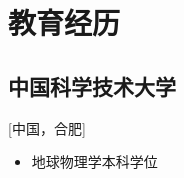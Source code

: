 \documentclass{mycv_cn}
\begin{document}
%
%
%

\section{教育经历}


\subsection{中国科学技术大学}[中国，合肥]
\vspace{-\parskip}%
\begin{itemize}[label={}]
  \item 地球物理学本科学位 
\end{itemize}
\end{document}
